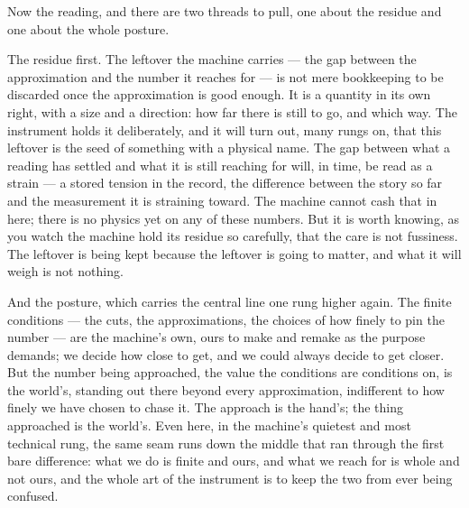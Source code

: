 Now the reading, and there are two threads to pull, one about the residue and one about the whole posture.

The residue first. The leftover the machine carries --- the gap between the approximation and the number it
reaches for --- is not mere bookkeeping to be discarded once the approximation is good enough. It is a quantity
in its own right, with a size and a direction: how far there is still to go, and which way. The instrument holds
it deliberately, and it will turn out, many rungs on, that this leftover is the seed of something with a
physical name. The gap between what a reading has settled and what it is still reaching for will, in time, be
read as a strain --- a stored tension in the record, the difference between the story so far and the measurement
it is straining toward. The machine cannot cash that in here; there is no physics yet on any of these numbers. But it is
worth knowing, as you watch the machine hold its residue so carefully, that the care is not fussiness. The
leftover is being kept because the leftover is going to matter, and what it will weigh is not nothing.

And the posture, which carries the central line one rung higher again. The finite conditions --- the cuts, the
approximations, the choices of how finely to pin the number --- are the machine's own, ours to make and remake as
the purpose demands; we decide how close to get, and we could always decide to get closer. But the number being
approached, the value the conditions are conditions on, is the world's, standing out there beyond every
approximation, indifferent to how finely we have chosen to chase it. The approach is the hand's; the thing
approached is the world's. Even here, in the machine's quietest and most technical rung, the same seam runs down
the middle that ran through the first bare difference: what we do is finite and ours, and what we reach for is
whole and not ours, and the whole art of the instrument is to keep the two from ever being confused.
